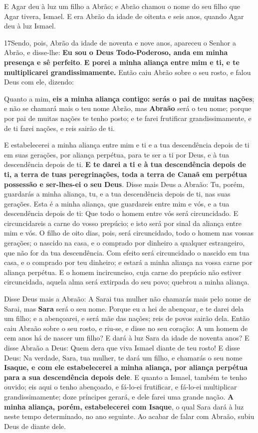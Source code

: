 E Agar deu à luz um filho a Abrão; e Abrão chamou o nome do seu
filho que Agar tivera, Ismael. E era Abrão da idade de
oitenta e seis anos, quando Agar deu à luz Ismael.

\smallskip

\lettrine{17} Sendo, pois, Abrão da idade de noventa e nove
anos, apareceu o Senhor a Abrão, e disse-lhe: \textbf{Eu sou o Deus
Todo-Poderoso, anda em minha presença e sê perfeito}. \textbf{E
porei a minha aliança entre mim e ti, e te multiplicarei
grandissimamente.} Então caiu Abrão sobre o seu rosto, e falou
Deus com ele, dizendo:

Quanto a mim, \textbf{eis a minha aliança contigo: serás o pai de
muitas nações}; e não se chamará mais o teu nome Abrão, mas
\textbf{Abraão} será o teu nome; porque por pai de muitas nações te
tenho posto; e te farei frutificar grandissimamente, e de ti
farei nações, e reis sairão de ti.

E estabelecerei a minha aliança entre mim e ti e a tua
descendência depois de ti em suas gerações, por aliança perpétua,
para te ser a ti por Deus, e à tua descendência depois de ti.
\textbf{E te darei a ti e à tua descendência depois de ti, a
terra de tuas peregrinações, toda a terra de Canaã em perpétua
possessão e ser-lhes-ei o seu Deus}. Disse mais Deus a Abraão:
Tu, porém, guardarás a minha aliança, tu, e a tua descendência
depois de ti, nas suas gerações. Esta é a minha aliança, que
guardareis entre mim e vós, e a tua descendência depois de ti: Que
todo o homem entre vós será circuncidado. E circuncidareis a
carne do vosso prepúcio; e isto será por sinal da aliança entre mim
e vós. O filho de oito dias, pois, será circuncidado, todo o
homem nas vossas gerações; o nascido na casa, e o comprado por
dinheiro a qualquer estrangeiro, que não for da tua descendência.
Com efeito será circuncidado o nascido em tua casa, e o
comprado por teu dinheiro; e estará a minha aliança na vossa carne
por aliança perpétua. E o homem incircunciso, cuja carne do
prepúcio não estiver circuncidada, aquela alma será extirpada do seu
povo; quebrou a minha aliança.

Disse Deus mais a Abraão: A Sarai tua mulher não chamarás mais
pelo nome de Sarai, mas \textbf{Sara} será o seu nome. Porque
eu a hei de abençoar, e te darei dela um filho; e a abençoarei, e
será mãe das nações; reis de povos sairão dela. Então caiu
Abraão sobre o seu rosto, e riu-se, e disse no seu coração: A um
homem de cem anos há de nascer um filho? E dará à luz Sara da idade
de noventa anos? E disse Abraão a Deus: Quem dera que viva
Ismael diante de teu rosto! E disse Deus: Na verdade, Sara,
tua mulher, te dará um filho, e chamarás o seu nome \textbf{Isaque,
e com ele estabelecerei a minha aliança, por aliança perpétua para a
sua descendência depois dele}. E quanto a Ismael, também te
tenho ouvido; eis aqui o tenho abençoado, e fá-lo-ei frutificar, e
fá-lo-ei multiplicar grandissimamente; doze príncipes gerará, e dele
farei uma grande nação. \textbf{A minha aliança, porém,
estabelecerei com Isaque}, o qual Sara dará à luz neste tempo
determinado, no ano seguinte. Ao acabar de falar com Abraão,
subiu Deus de diante dele.


